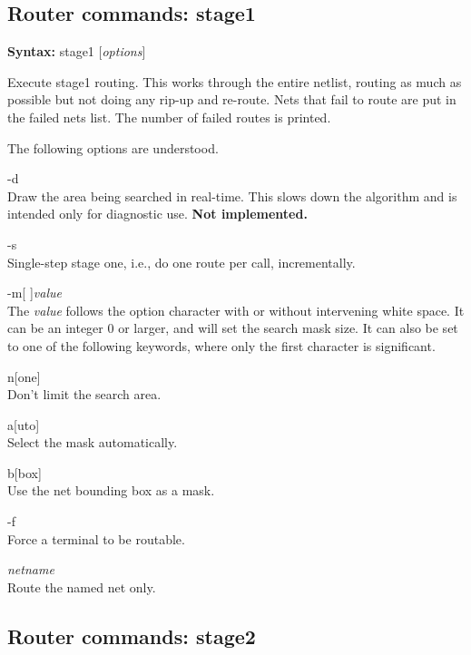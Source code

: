\subsection{Router commands: {\vt stage1}}

{\bf Syntax:} {\vt stage1} [{\it options\/}]

Execute stage1 routing.  This works through the entire netlist,
routing as much as possible but not doing any rip-up and re-route. 
Nets that fail to route are put in the failed nets list.  The number
of failed routes is printed.

The following options are understood.
\begin{description}
\item{\vt -d}\\
Draw the area being searched in real-time.  This slows down the
algorithm and is intended only for diagnostic use.  {\bf Not
implemented.}

\item{\vt -s}\\
Single-step stage one, i.e., do one route per call, incrementally.

\item{\vt -m}[ ]{\it value}\\
The {\it value} follows the option character with or without
intervening white space.  It can be an integer 0 or larger, and will
set the search mask size.  It can also be set to one of the following
keywords, where only the first character is significant.
\begin{description}
\item{\vt n}[{\vt one}]\\
Don't limit the search area.
\item{\vt a}[{\vt uto}]\\
Select the mask automatically.
\item{\vt b}[{\vt box}]\\
Use the net bounding box as a mask.
\end{description}

\item{\vt -f}\\
Force a terminal to be routable.

\item{\it netname}\\
Route the named net only.
\end{description}

\subsection{Router commands: {\vt stage2}}

